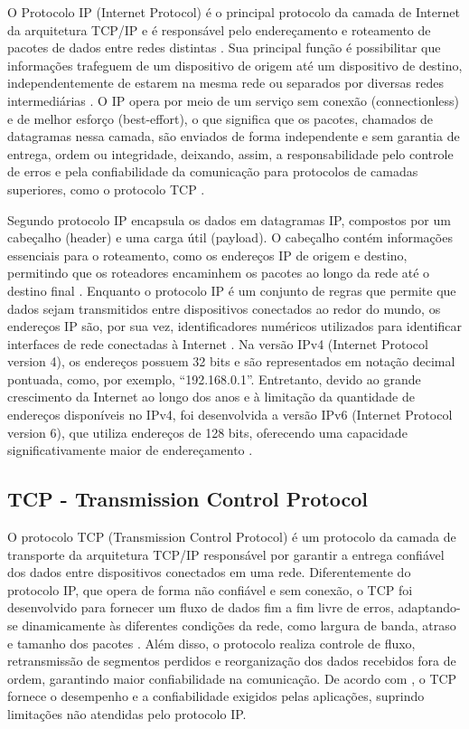 \documentclass[
    12pt,                %
    openright,           %
    oneside,             %
    a4paper,             %
    english,             %
    brazil               %
]{abntex2}
\begin{document}
O Protocolo IP (Internet Protocol) é o principal protocolo da camada de Internet da arquitetura TCP/IP e é responsável pelo endereçamento e roteamento de pacotes de dados entre redes distintas \cite{Tanenbaum2011,Stevens1994}. Sua principal função é possibilitar que informações trafeguem de um dispositivo de origem até um dispositivo de destino, independentemente de estarem na mesma rede ou separados por diversas redes intermediárias \cite{Tanenbaum2011,Stevens1994}. O IP opera por meio de um serviço sem conexão (connectionless) e de melhor esforço (best-effort), o que significa que os pacotes, chamados de datagramas nessa camada, são enviados de forma independente e sem garantia de entrega, ordem ou integridade, deixando, assim, a responsabilidade pelo controle de erros e pela confiabilidade da comunicação para protocolos de camadas superiores, como o protocolo TCP \cite{Tanenbaum2011,Stevens1994}.


Segundo  protocolo IP encapsula os dados em datagramas IP, compostos por um cabeçalho (header) e uma carga útil (payload). O cabeçalho contém informações essenciais para o roteamento, como os endereços IP de origem e destino, permitindo que os roteadores encaminhem os pacotes ao longo da rede até o destino final \cite{Tanenbaum2011,Stevens1994}. Enquanto o protocolo IP é um conjunto de regras que permite que dados sejam transmitidos entre dispositivos conectados ao redor do mundo, os endereços IP são, por sua vez, identificadores numéricos utilizados para identificar interfaces de rede conectadas à Internet \cite{Tanenbaum2011,Stevens1994}. Na versão IPv4 (Internet Protocol version 4), os endereços possuem 32 bits e são representados em notação decimal pontuada, como, por exemplo, “192.168.0.1”. Entretanto, devido ao grande crescimento da Internet ao longo dos anos e à limitação da quantidade de endereços disponíveis no IPv4, foi desenvolvida a versão IPv6 (Internet Protocol version 6), que utiliza endereços de 128 bits, oferecendo uma capacidade significativamente maior de endereçamento \cite{Tanenbaum2011,Stevens1994}.

\subsection{TCP - Transmission Control Protocol}

O protocolo TCP (Transmission Control Protocol) é um protocolo da camada de transporte da arquitetura TCP/IP responsável por garantir a entrega confiável dos dados entre dispositivos conectados em uma rede. Diferentemente do protocolo IP, que opera de forma não confiável e sem conexão, o TCP foi desenvolvido para fornecer um fluxo de dados fim a fim livre de erros, adaptando-se dinamicamente às diferentes condições da rede, como largura de banda, atraso e tamanho dos pacotes \cite{Tanenbaum2011}. Além disso, o protocolo realiza controle de fluxo, retransmissão de segmentos perdidos e reorganização dos dados recebidos fora de ordem, garantindo maior confiabilidade na comunicação. De acordo com , o TCP fornece o desempenho e a confiabilidade exigidos pelas aplicações, suprindo limitações não atendidas pelo protocolo IP.
\end{document}
